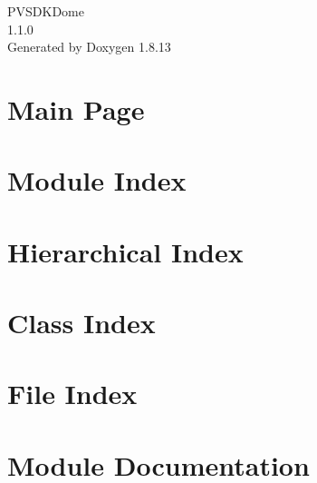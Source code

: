 \documentclass[twoside]{book}
\newcommand{\+}{\discretionary{\mbox{\scriptsize$\hookleftarrow$}}{}{}}
\newcommand{\clearemptydoublepage}{%
  \newpage{\pagestyle{empty}\cleardoublepage}%
}
\begin{document}
\hypersetup{pageanchor=false,
             bookmarksnumbered=true,
             pdfencoding=unicode
            }
\begin{titlepage}
\vspace*{7cm}
\begin{center}%
{\Large P\+V\+S\+D\+K\+Dome \\[1ex]\large 1.\+1.\+0 }\\
\vspace*{1cm}
{\large Generated by Doxygen 1.8.13}\\
\end{center}
\end{titlepage}
\clearemptydoublepage
{}
\tableofcontents
\clearemptydoublepage
{}
\hypersetup{pageanchor=true}

\chapter{Main Page}
\label{index}\hypertarget{index}{}
\chapter{Module Index}

\chapter{Hierarchical Index}

\chapter{Class Index}

\chapter{File Index}

\chapter{Module Documentation}


\end{document}
